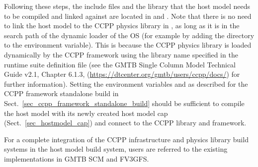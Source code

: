 Following these steps, the include files and the library  that the host model needs to be compiled and linked against are located in  and . Note that there is no need to link the host model to the CCPP physics library in , as long as it is in the search path of the dynamic loader of the OS (for example by adding the directory  to the  environment variable). This is because the CCPP physics library is loaded dynamically by the CCPP framework using the library name specified in the runtime suite definition file (see the GMTB Single Column Model Technical Guide v2.1, Chapter 6.1.3, (\url{https://dtcenter.org/gmtb/users/ccpp/docs/}) for further information). Setting the environment variables  and  as described for the CCPP framework standalone build in Sect.~\ref{sec_ccpp_framework_standalone_build} should be sufficient to compile the host model with its newly created host model cap (Sect.~\ref{sec_hostmodel_cap}) and connect to the CCPP library and framework.

For a complete integration of the CCPP infrastructure and physics library build systems in the host model build system, users are referred to the existing implementations in GMTB SCM and FV3GFS.